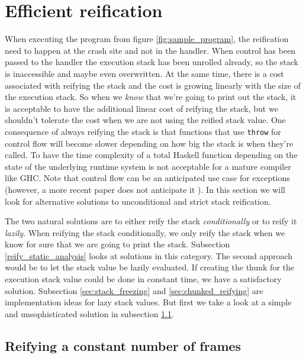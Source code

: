 \section{Efficient reification} \label{sec:lazy_reification}

When executing the program from figure
\ref{fig:sample_program}, the reification need to happen at the crash site and
not in the handler. When control has been passed to the handler the
execution stack has been unrolled already, so the stack is inaccessible
and maybe even overwritten. At the same time, there is a cost associated
with reifying the stack and the cost is growing linearly with the size
of the execution stack. So when we \emph{know} that we're going to print
out the stack, it is acceptable to have the additional linear cost of
reifying the stack, but we shouldn't tolerate the cost when we are not
using the reified stack value. One consequence of always reifying the
stack is that functions that use \texttt{throw} for control flow will
become slower depending on how big the stack is when they're called.
To have the time complexity of a total Haskell function depending on
the state of the underlying runtime system is not acceptable for a mature
compiler like GHC. Note that control flow can be an anticipated use case for
exceptions \cite{peyton1999semantics} (however, a more recent paper
does not anticipate it \cite{marlow2006extensible}).
In this section we will look for alternative solutions
to unconditional and strict stack reification.

The two natural solutions are to either reify the stack \emph{conditionally} or
to reify it \emph{lazily}. When reifying the stack conditionally, we only reify the stack
when we know for sure that we are going to print the stack. Subsection
\ref{reify_static_analysis} looks at solutions in this category.
The second approach would be to let the stack value be lazily evaluated. If creating the thunk for
the execution stack value could be done in constant time, we have a
satisfactory solution. Subsection \ref{sec:stack_freezing}
and \ref{sec:chunked_reifying} are implementation ideas for lazy stack values.
But first we take a look at a simple and
unsophisticated solution in subsection \ref{sec:constant_frames}.

\subsection{Reifying a constant number of frames} \label{sec:constant_frames}


